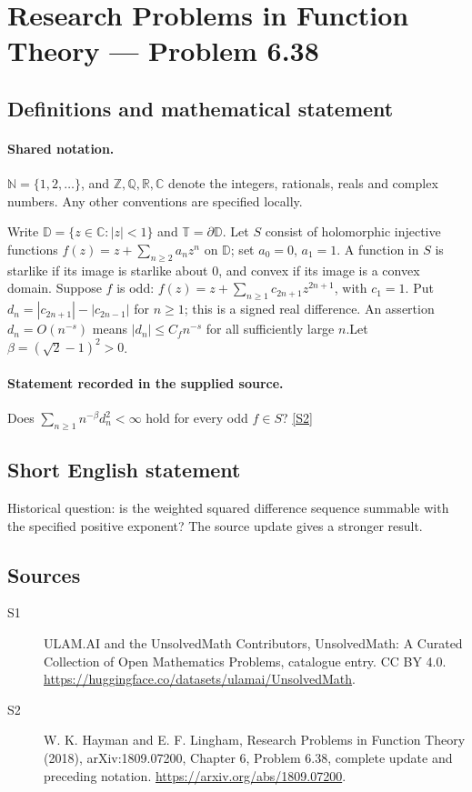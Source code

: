 \documentclass[11pt]{article}
\newcommand{\sref}[2]{\hyperlink{source:#1:#2}{[S#2]}}
\begin{document}
\section{Research Problems in Function Theory — Problem 6.38}\label{statement}

\subsection{Definitions and mathematical statement}

\paragraph{Shared notation.}$\mathbb N=\{1,2,\ldots\}$, and $\mathbb Z,\mathbb Q,\mathbb R,\mathbb C$ denote the integers, rationals, reals and complex numbers. Any other conventions are specified locally.


Write $\mathbb D=\{z\in\mathbb C:|z|<1\}$ and $\mathbb T=\partial\mathbb D$. Let $S$ consist of holomorphic injective functions $f(z)=z+\sum_{n\ge2}a_nz^n$ on $\mathbb D$; set $a_0=0$, $a_1=1$. A function in $S$ is starlike if its image is starlike about $0$, and convex if its image is a convex domain. Suppose $f$ is odd: $f(z)=z+\sum_{n\ge1}c_{2n+1}z^{2n+1}$, with $c_1=1$. Put $d_n=|c_{2n+1}|-|c_{2n-1}|$ for $n\ge1$; this is a signed real difference. An assertion $d_n=O(n^{-s})$ means $|d_n|\le C_f n^{-s}$ for all sufficiently large $n$.Let $\beta=(\sqrt2-1)^2>0$.
\paragraph{Statement recorded in the supplied source.}
Does $\sum_{n\ge1}n^{-\beta}d_n^2<\infty$ hold for every odd $f\in S$? \sref{statement}{2}
\subsection{Short English statement}
Historical question: is the weighted squared difference sequence summable with the specified positive exponent? The source update gives a stronger result.
\subsection{Sources}
\begin{description}
\item[\hypertarget{source:statement:1}{S1}] ULAM.AI and the UnsolvedMath Contributors, UnsolvedMath: A Curated Collection of Open Mathematics Problems, catalogue entry. CC BY 4.0. \url{https://huggingface.co/datasets/ulamai/UnsolvedMath}.
\item[\hypertarget{source:statement:2}{S2}] W. K. Hayman and E. F. Lingham, Research Problems in Function Theory (2018), arXiv:1809.07200, Chapter 6, Problem 6.38, complete update and preceding notation. \url{https://arxiv.org/abs/1809.07200}.
\end{description}
\label{end:statement}
\end{document}
